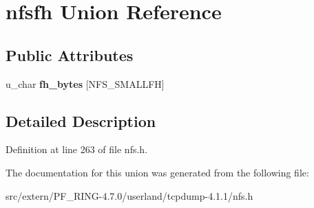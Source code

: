 \hypertarget{unionnfsfh}{
\section{nfsfh Union Reference}
\label{unionnfsfh}
}
\subsection*{Public Attributes}
\begin{DoxyCompactItemize}
\item 
\hypertarget{unionnfsfh_aae2e3327dd65688508e5011b05059a98}{
u\_\-char {\bfseries fh\_\-bytes} \mbox{[}NFS\_\-SMALLFH\mbox{]}}
\label{unionnfsfh_aae2e3327dd65688508e5011b05059a98}

\end{DoxyCompactItemize}


\subsection{Detailed Description}


Definition at line 263 of file nfs.h.



The documentation for this union was generated from the following file:\begin{DoxyCompactItemize}
\item 
src/extern/PF\_\-RING-\/4.7.0/userland/tcpdump-\/4.1.1/nfs.h\end{DoxyCompactItemize}
